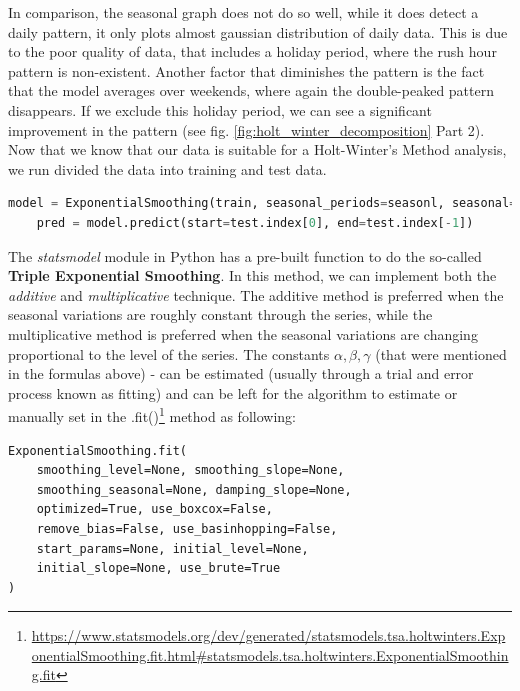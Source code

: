 In comparison, the seasonal graph does not do so well, while it does detect a daily pattern, it only plots almost gaussian distribution of daily data. This is due to the poor quality of data, that includes a holiday period, where the rush hour pattern is non-existent. Another factor that diminishes the pattern is the fact that the model averages over weekends, where again the double-peaked pattern disappears. If we exclude this holiday period, we can see a significant improvement in the pattern (see fig. \ref{fig:holt_winter_decomposition} Part 2).\\

Now that we know that our data is suitable for a Holt-Winter's Method analysis, we run divided the data into training and test data.
\begin{lstlisting}[language=Python, caption=Exponential Smoothing method]
    model = ExponentialSmoothing(train, seasonal_periods=seasonl, seasonal='mul').fit()
    pred = model.predict(start=test.index[0], end=test.index[-1])
\end{lstlisting}
The \textit{statsmodel} module in Python has a pre-built function to do the so-called \textbf{Triple Exponential Smoothing}. In this method, we can implement both the \textit{additive} and \textit{multiplicative} technique. The additive method is preferred when the seasonal variations are roughly constant through the series, while the multiplicative method is preferred when the seasonal variations are changing proportional to the level of the series.
The constants \textbf{$\alpha, \beta, \gamma$} (that were mentioned in the formulas above) - can be estimated (usually through a trial and error process known as fitting) and can be left for the algorithm to estimate or manually set in the .fit()\footnote{\url{https://www.statsmodels.org/dev/generated/statsmodels.tsa.holtwinters.ExponentialSmoothing.fit.html#statsmodels.tsa.holtwinters.ExponentialSmoothing.fit}} method as following:
\begin{lstlisting}
ExponentialSmoothing.fit(
    smoothing_level=None, smoothing_slope=None, 
    smoothing_seasonal=None, damping_slope=None, 
    optimized=True, use_boxcox=False, 
    remove_bias=False, use_basinhopping=False, 
    start_params=None, initial_level=None, 
    initial_slope=None, use_brute=True
)
\end{lstlisting}
